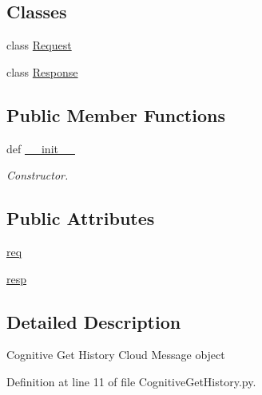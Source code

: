 \subsection*{Classes}
\begin{DoxyCompactItemize}
\item 
class \hyperlink{classRappCloud_1_1CloudMsgs_1_1CognitiveGetHistory_1_1CognitiveGetHistory_1_1Request}{Request}
\item 
class \hyperlink{classRappCloud_1_1CloudMsgs_1_1CognitiveGetHistory_1_1CognitiveGetHistory_1_1Response}{Response}
\end{DoxyCompactItemize}
\subsection*{Public Member Functions}
\begin{DoxyCompactItemize}
\item 
def \hyperlink{classRappCloud_1_1CloudMsgs_1_1CognitiveGetHistory_1_1CognitiveGetHistory_ab5e6eb326ce6b1d8f56998d6b2849e60}{\-\_\-\-\_\-init\-\_\-\-\_\-}
\begin{DoxyCompactList}\small\item\em Constructor. \end{DoxyCompactList}\end{DoxyCompactItemize}
\subsection*{Public Attributes}
\begin{DoxyCompactItemize}
\item 
\hyperlink{classRappCloud_1_1CloudMsgs_1_1CognitiveGetHistory_1_1CognitiveGetHistory_a6c43243c69037f68215661add0ac83fc}{req}
\item 
\hyperlink{classRappCloud_1_1CloudMsgs_1_1CognitiveGetHistory_1_1CognitiveGetHistory_a88c6a6e9c94af7529dfc6d7aa562f068}{resp}
\end{DoxyCompactItemize}


\subsection{Detailed Description}
\begin{DoxyVerb}Cognitive Get History Cloud Message object \end{DoxyVerb}
 

Definition at line 11 of file Cognitive\-Get\-History.\-py.




